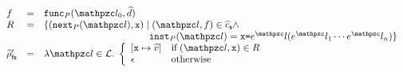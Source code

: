 \begin{itemize}
\[\begin{array}{lcl}
        \func &=& \getfunc{\prog}(\lab_0, \aelem)\\
        R &=& \{ (\getnext{\prog}(\lab), \varx) \mid
          (\lab, \func) \in \ascall \wedge\\&&

          \phantom{\{ (\getnext{\prog}(\lab), \varx) \mid}
          \getinst{\prog}(\lab) = \varx \kweq \expr^\lab (\expr^\lab_1 \cdots
          \expr^\lab_n)
        \}\\

        \afsenv' &=& \lambda \lab \in \labset. \; \left\{
          \begin{array}{ll}
            [\varx \mapsto \aval]
            & \text{if} \; (\lab, \varx) \in R\\

            \epsilon
            & \text{otherwise}\\
          \end{array}
        \right.\\
      \end{array}
    \]
\end{itemize}

